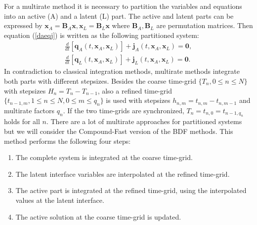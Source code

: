 \documentclass{report}
\begin{document}
For a multirate method it is necessary to partition the variables and
equations into an active (A) and a latent (L) part.
The active and latent parts can be expressed by
$\mathbf{x}_A = \mathbf{B}_A \mathbf{x},\mathbf{x}_L = \mathbf{B}_L \mathbf{x}$ where
$\mathbf{B}_A,\mathbf{B}_L$ are permutation matrices.
Then equation (\ref{daeqj}) is written as the following partitioned system:
\begin{equation}\label{part_DAE}
\begin{array}{c}
\frac{d}{dt}\left [\mathbf{q}_{A}(t,\mathbf{x}_A,\mathbf{x}_L)\right
]+\mathbf{j}_{A}(t,\mathbf{x}_A,\mathbf{x}_L)=\mathbf{0},\\
\frac{d}{dt}\left [\mathbf{q}_{L}(t,\mathbf{x}_A,\mathbf{x}_L)\right
]+\mathbf{j}_{L}(t,\mathbf{x}_A,\mathbf{x}_L)=\mathbf{0}.
\end{array}
\end{equation}
In contradiction to classical integration methods, multirate methods
integrate both parts with different stepsizes.
Besides the coarse time-grid $\{T_n,0\leq n \leq N\}$ with stepsizes $H_n
= T_n - T_{n-1}$, also a refined time-grid $\{t_{n-1,m},1\leq n \leq N, 0
\leq m \leq q_n\}$ is used with stepsizes $h_{n,m} = t_{n,m} - t_{n,m-1}$
and multirate factors $q_n$. If the two time-grids are synchronized,
$T_n= t_{n,0} = t_{n-1,q_n}$ holds for all $n$.
There are a lot of multirate approaches for partitioned systems
but we will consider the Compound-Fast version of the BDF methods.
This method performs the following four steps:
\begin{enumerate}
\item The complete system is integrated at the coarse time-grid.
\item The latent interface variables are interpolated at the refined time-grid.
\item The active part is integrated at the refined time-grid, using the
interpolated values at the latent interface.
\item The active solution at the coarse time-grid is updated.
\end{enumerate}
\end{document}
